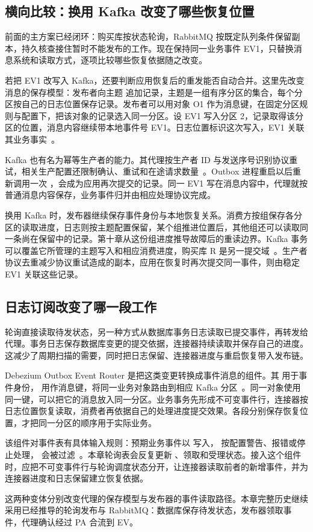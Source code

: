 \subsection*{横向比较：换用 Kafka 改变了哪些恢复位置}

前面的主方案已经闭环：购买库按状态轮询，RabbitMQ 按既定队列条件保留副本，持久核查接住暂时不能发布的工作。现在保持同一业务事件 EV1，只替换消息系统和读取方式，逐项比较哪些恢复依据随之改变。

若把 EV1 改写入 Kafka，还要判断应用恢复后的重发能否自动合并。这里先改变消息的保存模型：发布者向主题  追加记录，主题是一组有序分区的集合，每个分区按自己的日志位置保存记录。发布者可以用对象 O1 作为消息键，在固定分区规则与配置下，把该对象的记录选入同一分区。设 EV1 写入分区 2，记录取得该分区的位置，消息内容继续带本地事件号 EV1。日志位置标识这次写入，EV1 关联其业务事实~\cite{kafka-design}。

Kafka 也有名为幂等生产者的能力。其代理按生产者 ID 与发送序号识别协议重试，相关生产配置还限制确认、重试和在途请求数量~\cite{kafka-producer,kafka-design}。Outbox 进程重启以后重新调用一次 ，会成为应用再次提交的记录。同一 EV1 写在消息内容中，代理就按普通消息内容保存，业务事件归并由相应处理协议完成。

换用 Kafka 时，发布器继续保存事件身份与本地恢复关系。消费方按组保存各分区的读取进度，日志则按主题配置保留，某个组推进位置后，其他组还可以读取同一条尚在保留中的记录。第十章从这份组进度推导故障后的重读边界。Kafka 事务可以覆盖它所管理的主题写入和相应消费进度，购买库 R 是另一提交域~\cite{kafka-design}。生产者协议去重减少协议重试造成的副本，应用在恢复时再次提交同一事件，则由稳定 EV1 关联这些记录。

\subsection*{日志订阅改变了哪一段工作}

轮询直接读取待发状态，另一种方式从数据库事务日志读取已提交事件，再转发给代理。事务日志保存数据库变更的提交依据，连接器持续读取并保存自己的进度。这减少了周期扫描的需要，同时把日志保留、连接器进度与重启恢复带入发布链。

Debezium Outbox Event Router 是把这类变更转换成事件消息的组件。其  用于事件身份， 用作消息键，将同一业务对象路由到相应 Kafka 分区~\cite{debezium-outbox}。同一对象使用同一键，可以把它的消息放入同一分区。业务事务先形成不可变事件行，连接器按日志位置恢复读取，消费者再依据自己的处理进度提交效果。各段分别保存恢复位置，才把同一分区的顺序用于实际业务。

该组件对事件表有具体输入规则：预期业务事件以  写入， 按配置警告、报错或停止处理， 会被过滤~\cite{debezium-outbox}。本章轮询表会反复更新 、领取和受理状态。接入这个组件时，应把不可变事件行与轮询调度状态分开，让连接器读取前者的新增事件，并为连接器进度和日志保留建立恢复依据。

这两种变体分别改变代理的保存模型与发布器的事件读取路径。本章完整历史继续采用已经推导的轮询发布与 RabbitMQ：数据库保存待发状态，发布器领取事件，代理确认经过 PA 合流到 EV。
